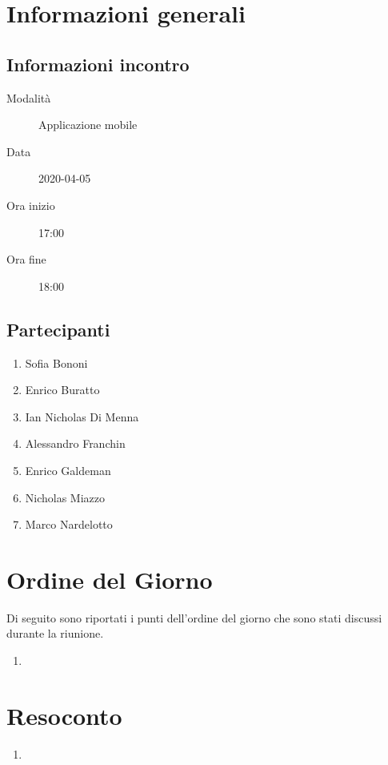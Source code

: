 \documentclass{article}
\begin{document}


\section{Informazioni generali}%
\label{sec:informazioni_generali}

\subsection{Informazioni incontro}%
\label{sub:informazioni_incontro}

\begin{description}
  \item[Modalità] Applicazione mobile 
  \item[Data] 2020-04-05
  \item[Ora inizio] 17:00
  \item[Ora fine] 18:00
\end{description}

\subsection{Partecipanti}%
\label{sub:partecipanti}

\begin{enumerate}
  \item Sofia Bononi
  \item Enrico Buratto
  \item Ian Nicholas Di Menna
  \item Alessandro Franchin
  \item Enrico Galdeman
  \item Nicholas Miazzo
  \item Marco Nardelotto
\end{enumerate}

\section{Ordine del Giorno}%
\label{ordine_del_giorno}
Di seguito sono riportati i punti dell'ordine del giorno che sono stati discussi durante la riunione.
\begin{enumerate}
  \item 
\end{enumerate}

\section{Resoconto}%
\label{resoconto}
\begin{enumerate}
  \item \textbf{}
\end{enumerate}
\end{document}
